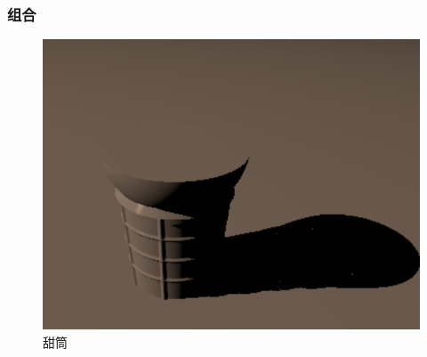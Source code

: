\documentclass[aspectratio=169]{ctexbeamer} %
\begin{document}
\begin{frame}
    \frametitle{组合}
    \begin{figure}[htbp]
        \centering
        \includegraphics[height=.75\textheight]{images/pre/cone/final.pdf}
        \caption{甜筒}
        \label{fig:cone_model}
    \end{figure}
\end{frame}
\end{document}
